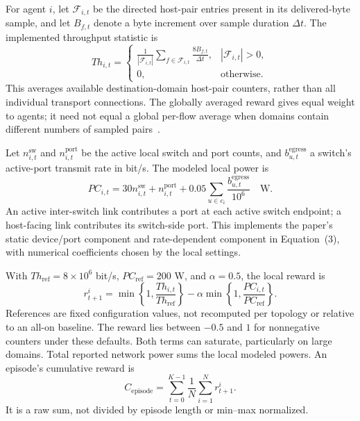 \documentclass[11pt,a4paper]{article}
\begin{document}
For agent $i$, let $\mathcal{F}_{i,t}$ be the directed host-pair entries present
in its delivered-byte sample, and let $B_{f,t}$ denote a byte increment over
sample duration $\Delta t$. The implemented throughput statistic is
\begin{equation}
 Th_{i,t}=\begin{cases}
 \displaystyle\frac{1}{|\mathcal{F}_{i,t}|}
      \sum_{f\in\mathcal{F}_{i,t}}\frac{8B_{f,t}}{\Delta t},
      & |\mathcal{F}_{i,t}|>0,\\
 0, & \text{otherwise}.
 \end{cases}
 \label{eq:throughput}
\end{equation}
This averages available destination-domain host-pair counters, rather than
all individual transport connections. The globally averaged reward gives equal
weight to agents; it need not equal a global per-flow average when domains
contain different numbers of sampled pairs~\cite{code-reward}.

Let $n^{\mathrm{sw}}_{i,t}$ and $n^{\mathrm{port}}_{i,t}$ be the active local
switch and port counts, and $b^{\mathrm{egress}}_{u,t}$ a switch's active-port
transmit rate in bit/s. The modeled local power is
\begin{equation}
 PC_{i,t}=30n^{\mathrm{sw}}_{i,t}+n^{\mathrm{port}}_{i,t}
       +0.05\sum_{u\in c_i}\frac{b^{\mathrm{egress}}_{u,t}}{10^6}
       \quad\mathrm{W}.
 \label{eq:power}
\end{equation}
An active inter-switch link contributes a port at each active switch endpoint;
a host-facing link contributes its switch-side port. This implements the
paper's static device/port component and rate-dependent component in
Equation~(3), with numerical coefficients chosen by the local settings.

With $Th_{\mathrm{ref}}=8\times10^6$ bit/s,
$PC_{\mathrm{ref}}=200$ W, and $\alpha=0.5$, the local reward is
\begin{equation}
 r_{t+1}^{i}=
 \min\left\{1,\frac{Th_{i,t}}{Th_{\mathrm{ref}}}\right\}
 -\alpha\min\left\{1,\frac{PC_{i,t}}{PC_{\mathrm{ref}}}\right\}.
 \label{eq:reward}
\end{equation}
References are fixed configuration values, not recomputed per topology or
relative to an all-on baseline. The reward lies between $-0.5$ and $1$ for
nonnegative counters under these defaults. Both terms can saturate, particularly
on large domains. Total reported network power sums the local modeled powers.
An episode's cumulative reward is
\begin{equation}
 C_{\mathrm{episode}}=\sum_{t=0}^{K-1}
                  \frac{1}{N}\sum_{i=1}^{N}r_{t+1}^i.
 \label{eq:cumulative}
\end{equation}
It is a raw sum, not divided by episode length or min--max normalized.
\end{document}
